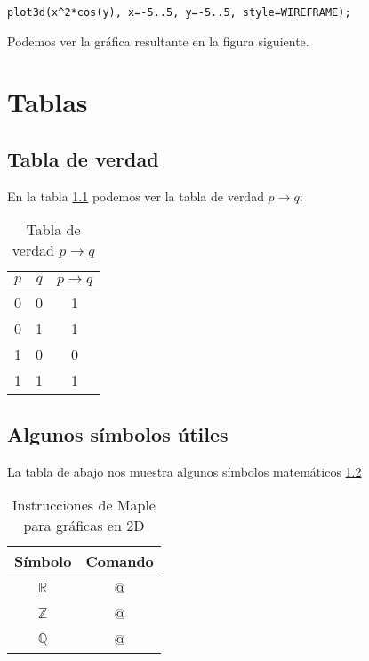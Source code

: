\documentclass[letterpaper,12pt]{book}
\begin{document}
\begin{verbatim}
plot3d(x^2*cos(y), x=-5..5, y=-5..5, style=WIREFRAME);
\end{verbatim}

Podemos ver la gráfica resultante en la figura siguiente.


\chapter{Tablas}

\section{Tabla de verdad}

En la tabla \ref{tab:cap8t1} podemos ver la tabla de verdad $p \rightarrow q$:

\begin{table}[ht]
	\caption{Tabla de verdad $p \rightarrow q$}
	\begin{center}
		\begin{tabular}{|c|c|c|} \hline
			$p$ & $q$ & $p \rightarrow q$\\\hline
			0 & 0 & 1 \\
			0 & 1 & 1 \\
			1 & 0 & 0 \\
			1 & 1 & 1 \\\hline
		\end{tabular}
	\end{center}
	\label{tab:cap8t1}
\end{table}

\section{Algunos símbolos útiles}

La tabla de abajo nos muestra algunos símbolos matemáticos \ref{tab:cap7t2}

\begin{table}[h!]
	\caption{Instrucciones de Maple para gráficas en 2D}
	\begin{center}
		\begin{tabular}{|c|c|} \hline
			Símbolo & Comando \\ \hline
			$$ \mathbb{R}$$ &  \verb@\mathbb{R}@  \\ \hline
			$$\mathbb{Z}$$ & \verb@\mathbb{Z}@ \\ \hline
			$$\mathbb{Q}$$ & \verb@\mathbb{Q}@ \\ \hline
		\end{tabular}
	\end{center}
	\label{tab:cap7t2}
\end{table}
\end{document}
